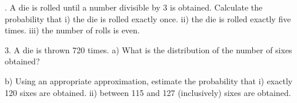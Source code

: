 


.	A die is rolled until a number divisible by 3 is obtained. Calculate the probability that
i)	the die is rolled exactly once.
ii)	the die is rolled exactly five times.
iii)	the number of rolls is even.


3.	A die is thrown 720 times.
a)	What is the distribution of the number of sixes obtained?

b) Using an appropriate approximation, estimate the probability that
i) exactly 120 sixes are obtained.
ii) between 115 and 127 (inclusively) sixes are obtained.

